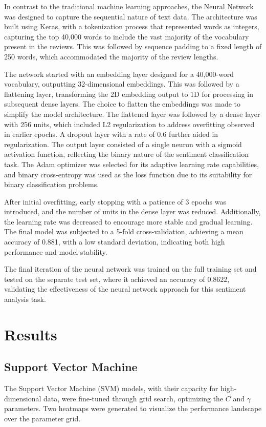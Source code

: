 \documentclass[conference]{IEEEtran}
\begin{document}
	In contrast to the traditional machine learning approaches, the Neural Network was designed to capture the sequential nature of text data. The architecture was built using Keras, with a tokenization process that represented words as integers, capturing the top 40,000 words to include the vast majority of the vocabulary present in the reviews. This was followed by sequence padding to a fixed length of 250 words, which accommodated the majority of the review lengths.
	
	The network started with an embedding layer designed for a 40,000-word vocabulary, outputting 32-dimensional embeddings. This was followed by a flattening layer, transforming the 2D embedding output to 1D for processing in subsequent dense layers. The choice to flatten the embeddings was made to simplify the model architecture. The flattened layer was followed by a dense layer with 256 units, which included L2 regularization to address overfitting observed in earlier epochs. A dropout layer with a rate of 0.6 further aided in regularization. The output layer consisted of a single neuron with a sigmoid activation function, reflecting the binary nature of the sentiment classification task. The Adam optimizer was selected for its adaptive learning rate capabilities, and binary cross-entropy was used as the loss function due to its suitability for binary classification problems.
	
	After initial overfitting, early stopping with a patience of 3 epochs was introduced, and the number of units in the dense layer was reduced. Additionally, the learning rate was decreased to encourage more stable and gradual learning. The final model was subjected to a 5-fold cross-validation, achieving a mean accuracy of 0.881, with a low standard deviation, indicating both high performance and model stability.
	
	The final iteration of the neural network was trained on the full training set and tested on the separate test set, where it achieved an accuracy of 0.8622, validating the effectiveness of the neural network approach for this sentiment analysis task.
	
	\section{Results}
	
	\subsection{Support Vector Machine}
	The Support Vector Machine (SVM) models, with their capacity for high-dimensional data, were fine-tuned through grid search, optimizing the $C$ and $\gamma$ parameters. Two heatmaps were generated to visualize the performance landscape over the parameter grid.
	
\end{document}
